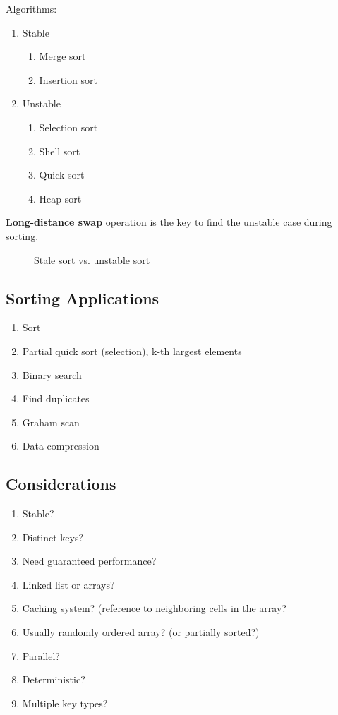 Algorithms:
\begin{enumerate}
\item Stable
\begin{enumerate}
\item Merge sort
\item Insertion sort
\end{enumerate} 
\item Unstable
\begin{enumerate}
\item Selection sort
\item Shell sort
\item Quick sort
\item Heap sort
\end{enumerate}
\end{enumerate}
\textbf{Long-distance swap} operation is the key to find the unstable case during sorting. 
\begin{figure}[hbtp]
\centering
{}
\caption{Stale sort vs. unstable sort}
\label{fig:trie} 
\end{figure}

\subsection{Sorting Applications}
\begin{enumerate}
\item Sort
\item Partial quick sort (selection), k-th largest elements 
\item Binary search
\item Find duplicates 
\item Graham scan
\item Data compression
\end{enumerate}

\subsection{Considerations}
\begin{enumerate}
\item Stable?
\item Distinct keys?
\item Need guaranteed performance?
\item Linked list or arrays?
\item Caching system? (reference to neighboring cells in the array? 
\item Usually randomly ordered array?
(or partially sorted?)\item Parallel?
\item Deterministic?
\item Multiple key types?
\end{enumerate}

